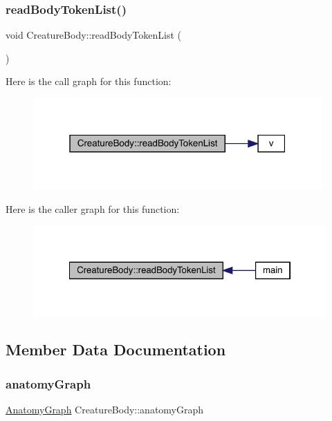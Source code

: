 \subsubsection{\texorpdfstring{read\+Body\+Token\+List()}{readBodyTokenList()}}
{\footnotesize\ttfamily void Creature\+Body\+::read\+Body\+Token\+List (\begin{DoxyParamCaption}{ }\end{DoxyParamCaption})}

Here is the call graph for this function\+:
\nopagebreak
\begin{figure}[H]
\begin{center}
\leavevmode
\includegraphics[width=313pt]{da/d7d/class_creature_body_a52d765dd974e81a549fd0cb27b355cf2_cgraph}
\end{center}
\end{figure}
Here is the caller graph for this function\+:
\nopagebreak
\begin{figure}[H]
\begin{center}
\leavevmode
\includegraphics[width=322pt]{da/d7d/class_creature_body_a52d765dd974e81a549fd0cb27b355cf2_icgraph}
\end{center}
\end{figure}


\subsection{Member Data Documentation}
\mbox{\label{class_creature_body_aa0fc6dc283a463e31f34c0ce9c2f1182}} 
\subsubsection{\texorpdfstring{anatomy\+Graph}{anatomyGraph}}
{\footnotesize\ttfamily \mbox{\hyperlink{_body_graph_8hpp_ab01b157c2e143191570b012d275fbf0d}{Anatomy\+Graph}} Creature\+Body\+::anatomy\+Graph}

